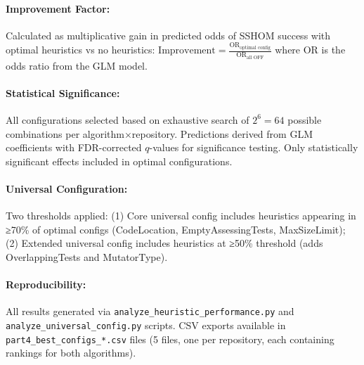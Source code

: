 \documentclass{article}
\begin{document}
\paragraph{Improvement Factor:} Calculated as multiplicative gain in predicted odds of SSHOM success with optimal heuristics vs no heuristics: $\text{Improvement} = \frac{\text{OR}_{\text{optimal config}}}{\text{OR}_{\text{all OFF}}}$ where OR is the odds ratio from the GLM model.

\paragraph{Statistical Significance:} All configurations selected based on exhaustive search of $2^6=64$ possible combinations per algorithm×repository. Predictions derived from GLM coefficients with FDR-corrected $q$-values for significance testing. Only statistically significant effects included in optimal configurations.

\paragraph{Universal Configuration:} Two thresholds applied: (1) Core universal config includes heuristics appearing in ≥70\% of optimal configs (CodeLocation, EmptyAssessingTests, MaxSizeLimit); (2) Extended universal config includes heuristics at ≥50\% threshold (adds OverlappingTests and MutatorType).

\paragraph{Reproducibility:} All results generated via \texttt{analyze\_heuristic\_performance.py} and \texttt{analyze\_universal\_config.py} scripts. CSV exports available in \texttt{part4\_best\_configs\_*.csv} files (5 files, one per repository, each containing rankings for both algorithms).
\end{document}
